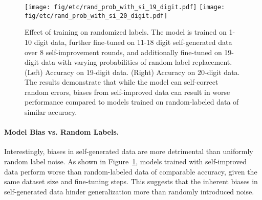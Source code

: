 \begin{figure}[ht!]
    \centering
    \texttt{[image: fig/etc/rand\_prob\_with\_si\_19\_digit.pdf]}
    \hspace{1mm}
    \texttt{[image: fig/etc/rand\_prob\_with\_si\_20\_digit.pdf]}
    \caption{Effect of training on randomized labels. The model is trained on 1-10 digit data, further fine-tuned on 11-18 digit self-generated data over 8 self-improvement rounds, and additionally fine-tuned on 19-digit data with varying probabilities of random label replacement. (Left) Accuracy on 19-digit data. (Right) Accuracy on 20-digit data. The results demonstrate that while the model can self-correct random errors, biases from self-improved data can result in worse performance compared to models trained on random-labeled data of similar accuracy.}
    \label{fig:random_label}
\end{figure}

\paragraph{Model Bias vs. Random Labels.}  
Interestingly, biases in self-generated data are more detrimental than uniformly random label noise.  As shown in Figure~\ref{fig:random_label}, models trained with self-improved data perform worse than random-labeled data of comparable accuracy, given the same dataset size and fine-tuning steps. 
This suggests that the inherent biases in self-generated data hinder generalization more than randomly introduced noise. 

